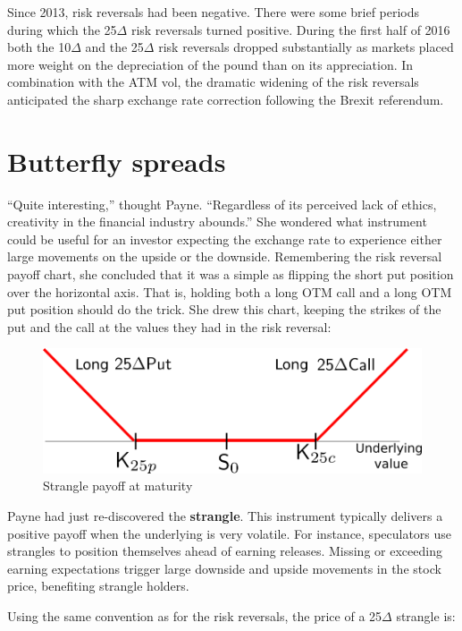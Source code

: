 \documentclass[]{book}
\theoremstyle{definition}
\theoremstyle{definition}
\theoremstyle{definition}
\theoremstyle{remark}
\begin{document}
Since 2013, risk reversals had been negative. There were some brief
periods during which the 25\(\Delta\) risk reversals turned positive.
During the first half of 2016 both the 10\(\Delta\) and the 25\(\Delta\)
risk reversals dropped substantially as markets placed more weight on
the depreciation of the pound than on its appreciation. In combination
with the ATM vol, the dramatic widening of the risk reversals
anticipated the sharp exchange rate correction following the Brexit
referendum.

\section{Butterfly spreads}\label{butterfly-spreads}

``Quite interesting,'' thought Payne. ``Regardless of its perceived lack
of ethics, creativity in the financial industry abounds.'' She wondered
what instrument could be useful for an investor expecting the exchange
rate to experience either large movements on the upside or the downside.
Remembering the risk reversal payoff chart, she concluded that it was a
simple as flipping the short put position over the horizontal axis. That
is, holding both a long OTM call and a long OTM put position should do
the trick. She drew this chart, keeping the strikes of the put and the
call at the values they had in the risk reversal:

\begin{figure}
\includegraphics[width=0.7\linewidth]{images/fig25BFSimple} \caption{Strangle payoff at maturity}\label{fig:unnamed-chunk-17}
\end{figure}

Payne had just re-discovered the \textbf{strangle}. This instrument
typically delivers a positive payoff when the underlying is very
volatile. For instance, speculators use strangles to position themselves
ahead of earning releases. Missing or exceeding earning expectations
trigger large downside and upside movements in the stock price,
benefiting strangle holders.

Using the same convention as for the risk reversals, the price of a
25\(\Delta\) strangle is:
\end{document}
